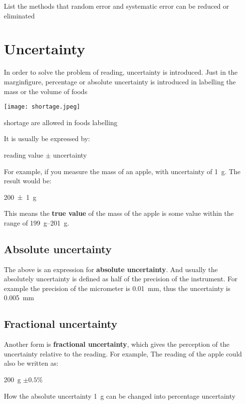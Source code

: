 \documentclass[a4paper]{tufte-handout}
\newenvironment{SummBox}
{\begin{tcolorbox}[breakable,colback=r1!30,colframe=r1,title=Summary]} {\end{tcolorbox}}
\begin{document}
\begin{SummBox}
List the methods that random error and systematic error can be reduced or eliminated
\vspace{1in}
\end{SummBox}

\section{Uncertainty}
In order to solve the problem of reading, uncertainty is introduced. Just in the marginfigure, percentage or absolute uncertainty is introduced in labelling the mass or the volume of foods
\begin{marginfigure}
\texttt{[image: shortage.jpeg]}
\caption{shortage are allowed in foods labelling}
\end{marginfigure}
It is usually be expressed by:
\begin{center}
	reading value $\pm$ uncertainty
\end{center}
For example, if you measure the mass of an apple, with uncertainty of \SI{1}{\gram}. The result would be:
\begin{center}
		\SI[multi-part-units = single]{200(1)}{\gram}
\end{center}
This means the \textbf{true value} of the mass of the apple is some value within the range of \SIrange{199}{201}{\gram}.

\subsection{Absolute uncertainty}
The above is an expression for \textbf{absolute uncertainty}. And usually the absolutely uncertainty is defined as half of the precision of the instrument. For example the precision of the micrometer is \SI{0.01}{\milli\metre}, thus the uncertainty is  \SI{0.005}{\milli\metre}

\subsection{Fractional uncertainty}
Another form is \textbf{fractional uncertainty}, which gives the perception of the uncertainty relative to the reading. For example, The reading of the apple could also be written as:
\begin{center}
	\SI{200}{\gram} $\pm 0.5\%$
\end{center}

\begin{SummBox}
How the absolute uncertainty \SI{1}{\gram} can be changed into percentage uncertainty
\vspace{0.5in}
\end{SummBox}
\end{document}
